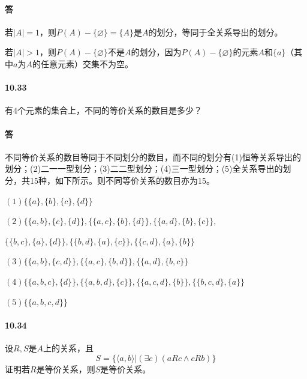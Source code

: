 \documentclass[UTF8]{ctexart}
\begin{document}
\paragraph{答}
    若$|A|=1$，则$P(A) - \{\varnothing\} = \{A\}$是$A$的划分，等同于全关系导出的划分。

    若$|A|>1$，则$P(A) - \{\varnothing\}$不是$A$的划分，因为$P(A) - \{\varnothing\}$的元素$A$和$\{a\}$（其中$a$为$A$的任意元素）交集不为空。
    
\paragraph{10.33} \label{10.33}
    有$4$个元素的集合上，不同的等价关系的数目是多少？

\paragraph{答}
    不同等价关系的数目等同于不同划分的数目，而不同的划分有(1)恒等关系导出的划分；(2)二一一型划分；(3)二二型划分；(4)三一型划分；(5)全关系导出的划分，共15种，如下所示。则不同等价关系的数目亦为15。

    $ (1) \{ \{ a \} , \{ b \} , \{ c \} , \{ d \} \} $

    $ (2) \{ \{ a,b \} , \{ c \} , \{ d \} \} , \{ \{ a,c \} , \{ b \} , \{ d \} \} , \{ \{ a,d \} , \{ b \} , \{ c \} \} ,$ 

    \quad \quad $ \{ \{ b,c \} , \{ a \} , \{ d \} \} , \{ \{ b,d \} , \{ a \} , \{ c \} \} , \{ \{ c,d \} , \{ a \} , \{ b \} \} $

    $ (3) \{ \{ a,b \} , \{ c,d \} \} , \{ \{ a,c \} , \{ b,d \} \} , \{ \{ a,d \} , \{ b,c \} \} $

    $ (4) \{ \{ a,b,c \} , \{ d \} \} , \{ \{ a,b,d \} , \{ c \} \} , \{ \{ a,c,d \} , \{ b \} \} , \{ \{ b,c,d \} , \{ a \} \} $

    $ (5) \{ \{ a,b,c,d \} \} $

\paragraph{10.34} \label{10.34}
    设$R,S$是$A$上的关系，且
    $$S = \{ \langle a,b \rangle | ( \exists c) (aRc \land cRb) \} $$
    证明若$R$是等价关系，则$S$是等价关系。
\end{document}
